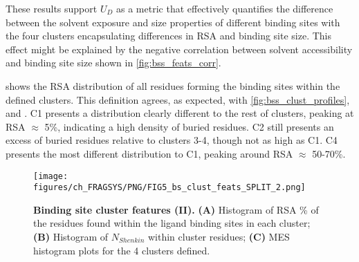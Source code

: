 These results support $U_{D}$ as a metric that effectively quantifies the difference between the solvent exposure and size properties of different binding sites with the four clusters encapsulating differences in RSA and binding site size. This effect might be explained by the negative correlation between solvent accessibility and binding site size shown in \autoref{fig:bss_feats_corr}.


 shows the RSA distribution of all residues forming the binding sites within the defined clusters. This definition agrees, as expected, with \autoref{fig:bss_clust_profiles}, and  . C1 presents a distribution clearly different to the rest of clusters, peaking at RSA $\approx$ 5\%, indicating a high density of buried residues. C2 still presents an excess of buried residues relative to clusters 3-4, though not as high as C1. C4 presents the most different distribution to C1, peaking around RSA $\approx$ 50-70\%.

\begin{figure}[ht!]
    \centering
    \texttt{[image: figures/ch\_FRAGSYS/PNG/FIG5\_bs\_clust\_feats\_SPLIT\_2.png]}
    \caption[Binding site cluster features (II)]{\textbf{Binding site cluster features (II).} \textbf{(A)} Histogram of RSA \% of the residues found within the ligand binding sites in each cluster; \textbf{(B)} Histogram of $N_{Shenkin}$ within cluster residues; \textbf{(C)} MES histogram plots for the 4 clusters defined.}
    \label{fig:bs_clusts_feats_2}
\end{figure}

